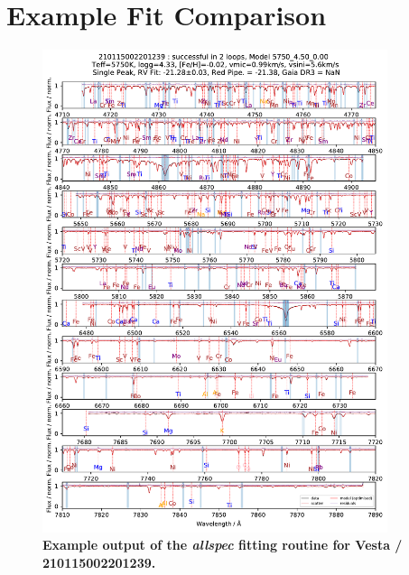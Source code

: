 \documentclass[
  journal=pasa,
  manuscript=research-paper, %
  year=2024,
  volume=37
]{cup-journal}
\begin{document}
\section{Example Fit Comparison}

\begin{figure}[ht]
 \centering
 \includegraphics[width=0.9\textwidth]{figures/210115002201239_single_fit_comparison.pdf} \caption{\textbf{Example output of the \textit{allspec} fitting routine for Vesta / 210115002201239.}} \label{fig:210115002201239_single_fit_comparison}
\end{figure}
\end{document}

